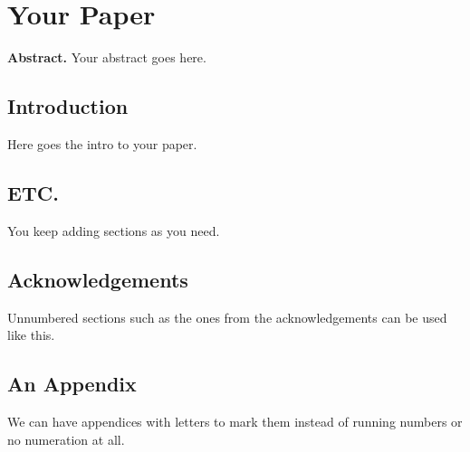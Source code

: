 

\chapter{Your Paper}


\textbf{Abstract.}
Your abstract goes here.

\section{Introduction}
Here goes the intro to your paper.

\section{ETC.}
You keep adding sections as you need.

\section*{Acknowledgements}
Unnumbered sections such as the ones from the acknowledgements can be used like this.

\begin{subappendices}

\section{An Appendix}
We can have appendices with letters to mark them instead of running numbers or no numeration at all.

    
\end{subappendices}
